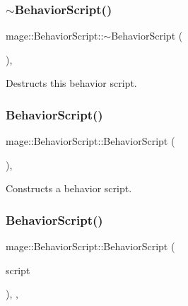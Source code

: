 \subsubsection{\texorpdfstring{$\sim$\+Behavior\+Script()}{~BehaviorScript()}}
{\footnotesize\ttfamily mage\+::\+Behavior\+Script\+::$\sim$\+Behavior\+Script (\begin{DoxyParamCaption}{ }\end{DoxyParamCaption})\hspace{0.3cm}{\ttfamily [virtual]}, {\ttfamily [default]}}

Destructs this behavior script. \hypertarget{classmage_1_1_behavior_script_adbe64d10ebd511f05af9e0930e245913}{}\label{classmage_1_1_behavior_script_adbe64d10ebd511f05af9e0930e245913} 
\subsubsection{\texorpdfstring{Behavior\+Script()}{BehaviorScript()}\hspace{0.1cm}{\footnotesize\ttfamily [1/3]}}
{\footnotesize\ttfamily mage\+::\+Behavior\+Script\+::\+Behavior\+Script (\begin{DoxyParamCaption}{ }\end{DoxyParamCaption})\hspace{0.3cm}{\ttfamily [protected]}, {\ttfamily [noexcept]}}

Constructs a behavior script. \hypertarget{classmage_1_1_behavior_script_a0f3baaa9549ab272f0711c06d33ad223}{}\label{classmage_1_1_behavior_script_a0f3baaa9549ab272f0711c06d33ad223} 
\subsubsection{\texorpdfstring{Behavior\+Script()}{BehaviorScript()}\hspace{0.1cm}{\footnotesize\ttfamily [2/3]}}
{\footnotesize\ttfamily mage\+::\+Behavior\+Script\+::\+Behavior\+Script (\begin{DoxyParamCaption}\item[{const \hyperlink{classmage_1_1_behavior_script}{Behavior\+Script} \&}]{script }\end{DoxyParamCaption})\hspace{0.3cm}{\ttfamily [protected]}, {\ttfamily [default]}, {\ttfamily [noexcept]}}

